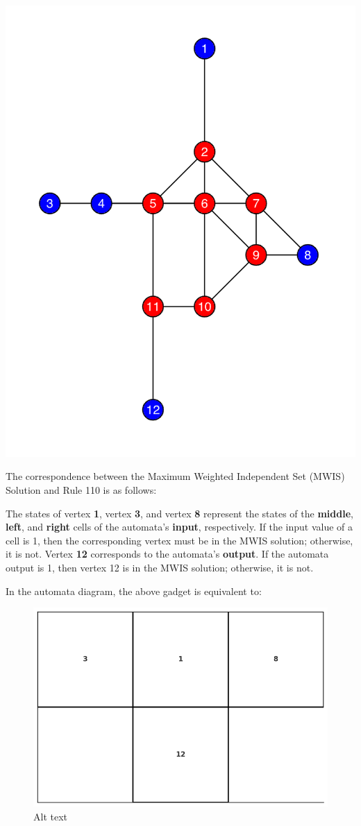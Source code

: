 \documentclass[twocolumn,superscriptaddress,english,showpacs,longbibliography]{revtex4-2}
\begin{document}
\includegraphics[width=0.7\columnwidth]{../notes/images/image-1.png}

The correspondence between the Maximum Weighted Independent Set (MWIS)
Solution and Rule 110 is as follows:

The states of vertex \textbf{1}, vertex \textbf{3}, and vertex
\textbf{8} represent the states of the \textbf{middle}, \textbf{left},
and \textbf{right} cells of the automata's \textbf{input},
respectively. If the input value of a cell is 1, then the corresponding
vertex must be in the MWIS solution; otherwise, it is not. Vertex
\textbf{12} corresponds to the automata's \textbf{output}. If the
automata output is 1, then vertex 12 is in the MWIS solution;
otherwise, it is not.

In the automata diagram, the above gadget is equivalent to:

\begin{figure}
\centering
\includegraphics[width=\columnwidth]{../notes/images/rule110.png}
\caption{Alt text}
\end{figure}
\end{document}
